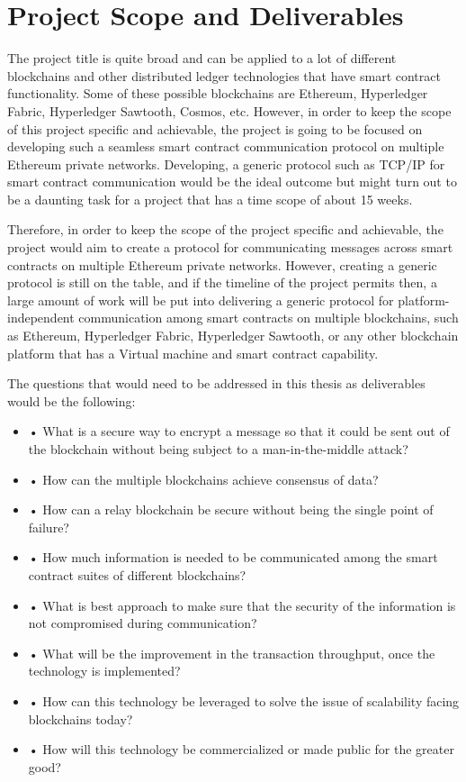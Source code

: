 \documentclass[a4paper,twoside,phd]{BYUPhys}
\begin{document}
\section{Project Scope and Deliverables}
The project title is quite broad and can be applied to a lot of different blockchains and other distributed ledger technologies that have smart contract functionality. Some of these possible blockchains are Ethereum, Hyperledger Fabric, Hyperledger Sawtooth, Cosmos, etc. However, in order to keep the scope of this project specific and achievable, the project is going to be focused on developing such a seamless smart contract communication protocol on multiple Ethereum private networks. Developing, a generic protocol such as TCP/IP for smart contract communication would be the ideal outcome but might turn out to be a daunting task for a project that has a time scope of about 15 weeks. \par
\par
Therefore, in order to keep the scope of the project specific and achievable, the project would aim to create a protocol for communicating messages across smart contracts on multiple Ethereum private networks. However, creating a generic protocol is still on the table, and if the timeline of the project permits then, a large amount of work will be put into delivering a generic protocol for platform-independent communication among smart contracts on multiple blockchains, such as Ethereum, Hyperledger Fabric, Hyperledger Sawtooth, or any other blockchain platform that has a Virtual machine and smart contract capability. \par
The questions that would need to be addressed in this thesis as deliverables would be the following:
\begin{itemize}
 

    \item• What is a secure way to encrypt a message so that it could be sent out of the blockchain without being subject to a man-in-the-middle attack?
    \item• How can the multiple blockchains achieve consensus of data?
    \item• How can a relay blockchain be secure without being the single point of failure?
    \item• How much information is needed to be communicated among the smart contract suites
of different blockchains?
    \item• What is best approach to make sure that the security of the information is not
compromised during communication?
    \item• What will be the improvement in the transaction throughput, once the technology is
implemented?
    \item• How can this technology be leveraged to solve the issue of scalability facing
blockchains today?
    \item• How will this technology be commercialized or made public for the greater good?
\end{itemize}
\end{document}
